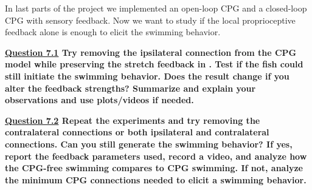 \documentclass{cmc}
\begin{document}
In last parts of the project we implemented an open-loop CPG and a closed-loop CPG with sensory feedback. Now we want to study if the local proprioceptive feedback alone is enough to elicit the swimming behavior.

\textbf{\underline{Question 7.1} Try removing the ipsilateral connection from the CPG model while preserving the stretch feedback in . Test if the fish could still initiate the swimming behavior. Does the result change if you alter the feedback strengths? Summarize and explain your observations and use plots/videos if needed.}

\textbf{\underline{Question 7.2} Repeat the experiments and try removing the contralateral connections or both ipsilateral and contralateral connections. Can you still generate the swimming behavior? If yes, report the feedback parameters used, record a video, and analyze how the CPG-free swimming compares to CPG swimming. If not, analyze the minimum CPG connections needed to elicit a swimming behavior.
}







\label{sec:references}






\end{document}
